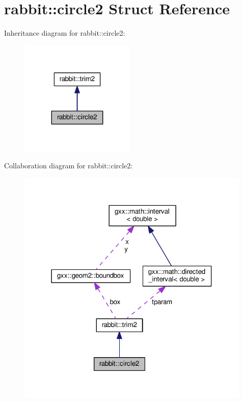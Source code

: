 \hypertarget{structrabbit_1_1circle2}{}\section{rabbit\+:\+:circle2 Struct Reference}
\label{structrabbit_1_1circle2}


Inheritance diagram for rabbit\+:\+:circle2\+:
\nopagebreak
\begin{figure}[H]
\begin{center}
\leavevmode
\includegraphics[width=155pt]{structrabbit_1_1circle2__inherit__graph}
\end{center}
\end{figure}


Collaboration diagram for rabbit\+:\+:circle2\+:
\nopagebreak
\begin{figure}[H]
\begin{center}
\leavevmode
\includegraphics[width=316pt]{structrabbit_1_1circle2__coll__graph}
\end{center}
\end{figure}
